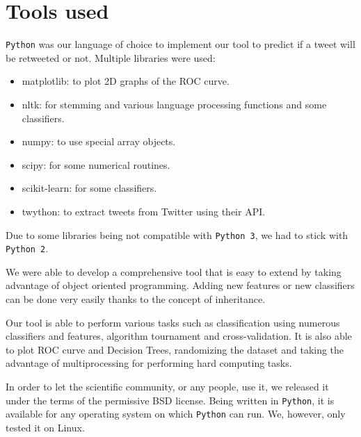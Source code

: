 \section{Tools used}
\label{sec:tools}

\verb|Python| was our language of choice to implement our tool to predict if a 
tweet will be retweeted or not. Multiple libraries were used:
\begin{itemize}
	\item matplotlib: to plot 2D graphs of the ROC curve.
	\item nltk: for stemming and various language processing functions and some 
		  classifiers.
	\item numpy: to use special array objects.
	\item scipy: for some numerical routines.
	\item scikit-learn: for some classifiers.
	\item twython: to extract tweets from Twitter using their API.
\end{itemize}

Due to some libraries being not compatible with \verb|Python 3|, we had to 
stick with \verb|Python 2|.

We were able to develop a comprehensive tool that is easy to extend by taking 
advantage of object oriented programming. Adding new features or new 
classifiers can be done very easily thanks to the concept of inheritance.

Our tool is able to perform various tasks such as classification using numerous 
classifiers and features, algorithm tournament and cross-validation. It is also 
able to plot ROC curve and Decision Trees, randomizing the dataset and taking 
the advantage of multiprocessing for performing hard computing tasks.

In order to let the scientific community, or any people, use it, we released it 
under the terms of the permissive BSD license. Being written in \verb|Python|, 
it is available for any operating system on which \verb|Python| can run. We, 
however, only tested it on Linux.
